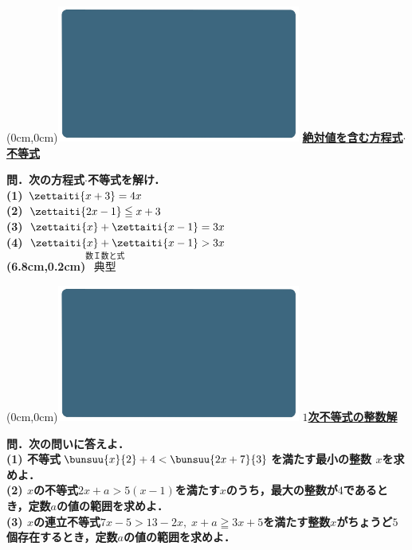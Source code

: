 \documentclass[10pt,
fleqn,
dvipdfmx,
uplatex
]{jsarticle}
\begin{document}
\at(0cm,0cm){\includegraphics[width=8cm,bb=0 0 1920 1080]{./youtube/thumbnails/templates/smart_background/数I数と式.jpeg}}
{\color{orange}\bf\boldmath\Large\underline{絶対値を含む方程式$\cdot$不等式}}\vspace{0.3zw}

\normalsize 
\bf\boldmath 問．次の方程式$\cdot$不等式を解け．\\
(1)  $\zettaiti{x+3}=4x$\\
(2)  $\zettaiti{2x-1}\leqq x+3$\\
(3)  $\zettaiti{x}+\zettaiti{x-1}=3x$\\
(4)  $\zettaiti{x}+\zettaiti{x-1}>3x$\\

\at(6.8cm,0.2cm){\small\color{bradorange}$\overset{\text{数Ｉ数と式}}{\text{典型}}$}


\newpage



\at(0cm,0cm){\includegraphics[width=8cm,bb=0 0 1920 1080]{./youtube/thumbnails/templates/smart_background/数I数と式.jpeg}}
{\color{orange}\bf\boldmath\huge\underline{$1$次不等式の整数解}}\vspace{0.3zw}

\scriptsize 
\bf\boldmath 問．次の問いに答えよ．\\
(1)  不等式$\bunsuu{x}{2}+4<\bunsuu{{2x+7}}{3}$を満たす最小の整数
$x$を求めよ．\\
(2)  $x$の不等式$2x+a>5\left(x-1\right)$を満たす$x$のうち，最大の整数が$4$であるとき，定数$a$の値の範囲を求めよ．\\
(3)  $x$の連立不等式$7x-5>{13}-2x,\;x+a\geqq 3x+5$を満たす整数$x$がちょうど$5$個存在するとき，定数$a$の値の範囲を求めよ．\\
\end{document}
